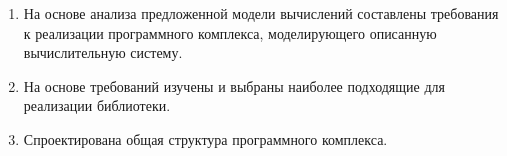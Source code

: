 \begin{enumerate}
  \item На основе анализа предложенной модели вычислений составлены требования к реализации программного комплекса, моделирующего описанную вычислительную систему.
  \item На основе требований изучены и выбраны наиболее подходящие для реализации библиотеки.
  \item Спроектирована общая структура программного комплекса. 
\end{enumerate}
